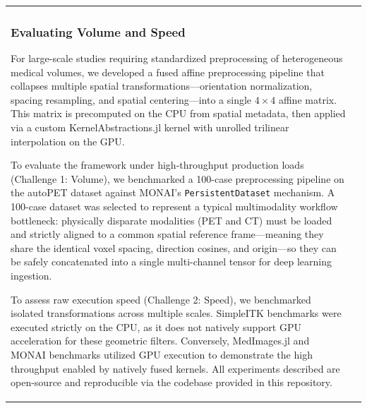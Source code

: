 \documentclass[10pt,letterpaper]{article}
\begin{document}
\begin{table}[H]
\begin{tabular}{|p{}|p{}|}
\subsubsection*{Evaluating Volume and Speed}
For large-scale studies requiring standardized preprocessing of heterogeneous medical volumes, we developed a fused affine preprocessing pipeline that collapses multiple spatial transformations---orientation normalization, spacing resampling, and spatial centering---into a single $4 \times 4$ affine matrix. This matrix is precomputed on the CPU from spatial metadata, then applied via a custom KernelAbstractions.jl kernel with unrolled trilinear interpolation on the GPU.

To evaluate the framework under high-throughput production loads (Challenge 1: Volume), we benchmarked a 100-case preprocessing pipeline on the autoPET dataset \cite{Dexl_2025} against MONAI's \texttt{PersistentDataset} mechanism. A 100-case dataset was selected to represent a typical multimodality workflow bottleneck: physically disparate modalities (PET and CT) must be loaded and strictly aligned to a common spatial reference frame---meaning they share the identical voxel spacing, direction cosines, and origin---so they can be safely concatenated into a single multi-channel tensor for deep learning ingestion. 

To assess raw execution speed (Challenge 2: Speed), we benchmarked isolated transformations across multiple scales. SimpleITK benchmarks were executed strictly on the CPU, as it does not natively support GPU acceleration for these geometric filters. Conversely, MedImages.jl and MONAI benchmarks utilized GPU execution to demonstrate the high throughput enabled by natively fused kernels. All experiments described are open-source and reproducible via the codebase provided in this repository.


\end{tabular}
\end{table}
\end{document}
